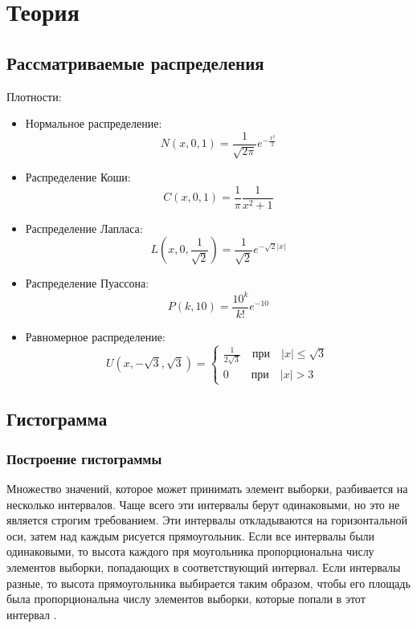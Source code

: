 \documentclass[12pt,a4paper]{article}
\begin{document}
	\section{Теория}
	
	\subsection{Рассматриваемые распределения}
	Плотности:
	\begin{itemize}
		\item Нормальное распределение:
		\begin{equation}\label{norm}
		\textit{N}(\textit{x}, 0, 1)=\frac{1}{\sqrt{2\pi}}e^{-\frac{x^2}{2}}
		\end{equation}
		
		\item Распределение Коши:
		\begin{equation}\label{cauchy}
		\textit{C}(\textit{x}, 0, 1)=\frac{1}{\pi}\frac{1}{x^2+1}
		\end{equation}
		
		\item Распределение Лапласа:
		\begin{equation}\label{laplace}
		\textit{L}(\textit{x}, 0, \frac{1}{\sqrt{2}})=\frac{1}{\sqrt{2}}e^{-\sqrt{2}|x|}
		\end{equation}
		
		\item Распределение Пуассона:
		\begin{equation}\label{poisson}
		\textit{P}(\textit{k}, 10)=\frac{10^k}{k!}e^{-10}
		\end{equation}
		
		\item Равномерное распределение:
		\begin{equation}\label{uniform}
		\textit{U}(\textit{x}, -\sqrt{3}, \sqrt{3})=
		\left\{
		\begin{array}{l}
		\frac{1}{2\sqrt{3}} \quad \text{при} \quad |x|\leq \sqrt{3}\\
		0 \quad \quad \text{при} \quad |x|>3
		\end{array}
		\right.
		\end{equation}
	\end{itemize}
	\subsection{Гистограмма}
	\subsubsection{Построение гистограммы}
	Множество значений, которое может принимать элемент выборки, разбивается на несколько интервалов. Чаще всего эти интервалы берут одинаковыми, но это не является строгим требованием. Эти интервалы откладываются на горизонтальной оси, затем над каждым рисуется прямоугольник. Если все интервалы были одинаковыми, то высота каждого пря моугольника пропорциональна числу элементов выборки, попадающих в соответствующий интервал. Если интервалы разные, то высота прямоугольника выбирается таким образом, чтобы его площадь была пропорциональна числу элементов выборки, которые попали в этот интервал \cite{hist_ref}.
	\newpage
	
\end{document}
